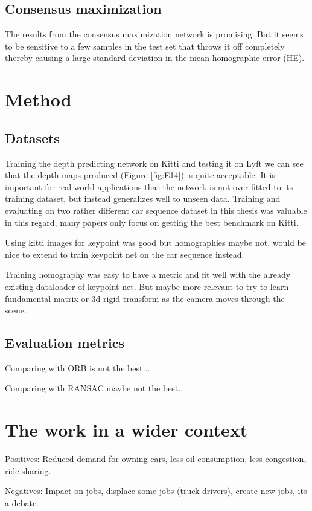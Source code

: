 \subsection{Consensus maximization}

The results from the consensus maximization network is promising. But it seems to be sensitive to a few samples in the test set that throws it off completely thereby causing a large standard deviation in the mean homographic error (HE).

\section{Method}

\subsection{Datasets}

Training the depth predicting network on Kitti and testing it on Lyft we can see that the depth maps produced (Figure \ref{fig:E14}) is quite acceptable. It is important for real world applications that the network is not over-fitted to its training dataset, but instead generalizes well to unseen data. Training and evaluating on two rather different car sequence dataset in this thesis was valuable in this regard, many papers only focus on getting the best benchmark on Kitti.

Using kitti images for keypoint was good but homographies maybe not, would be nice to extend to train keypoint net on the car sequence instead.

Training homography was easy to have a metric and fit well with the already existing dataloader of keypoint net. But maybe more relevant to try to learn fundamental matrix or 3d rigid transform as the camera moves through the scene.

\subsection{Evaluation metrics}

Comparing with ORB is not the best...

Comparing with RANSAC maybe not the best..

\section{The work in a wider context}

Positives: Reduced demand for owning cars, less oil consumption, less congestion, ride sharing.\cite{transportation}

Negatives: Impact on jobs, displace some jobs (truck drivers), create new jobs, its a debate.\cite{sociology}